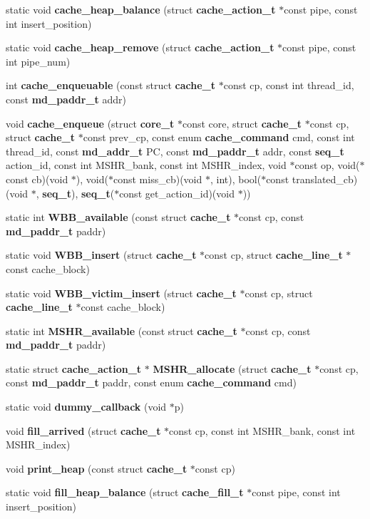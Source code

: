\begin{CompactItemize}
\item 
static void {\bf cache\_\-heap\_\-balance} (struct {\bf cache\_\-action\_\-t} $\ast$const pipe, const int insert\_\-position)
\item 
static void {\bf cache\_\-heap\_\-remove} (struct {\bf cache\_\-action\_\-t} $\ast$const pipe, const int pipe\_\-num)
\item 
int {\bf cache\_\-enqueuable} (const struct {\bf cache\_\-t} $\ast$const cp, const int thread\_\-id, const {\bf md\_\-paddr\_\-t} addr)
\item 
void {\bf cache\_\-enqueue} (struct {\bf core\_\-t} $\ast$const core, struct {\bf cache\_\-t} $\ast$const cp, struct {\bf cache\_\-t} $\ast$const prev\_\-cp, const enum {\bf cache\_\-command} cmd, const int thread\_\-id, const {\bf md\_\-addr\_\-t} PC, const {\bf md\_\-paddr\_\-t} addr, const {\bf seq\_\-t} action\_\-id, const int MSHR\_\-bank, const int MSHR\_\-index, void $\ast$const op, void($\ast$const cb)(void $\ast$), void($\ast$const miss\_\-cb)(void $\ast$, int), bool($\ast$const translated\_\-cb)(void $\ast$, {\bf seq\_\-t}), {\bf seq\_\-t}($\ast$const get\_\-action\_\-id)(void $\ast$))
\item 
static int {\bf WBB\_\-available} (const struct {\bf cache\_\-t} $\ast$const cp, const {\bf md\_\-paddr\_\-t} paddr)
\item 
static void {\bf WBB\_\-insert} (struct {\bf cache\_\-t} $\ast$const cp, struct {\bf cache\_\-line\_\-t} $\ast$const cache\_\-block)
\item 
static void {\bf WBB\_\-victim\_\-insert} (struct {\bf cache\_\-t} $\ast$const cp, struct {\bf cache\_\-line\_\-t} $\ast$const cache\_\-block)
\item 
static int {\bf MSHR\_\-available} (const struct {\bf cache\_\-t} $\ast$const cp, const {\bf md\_\-paddr\_\-t} paddr)
\item 
static struct {\bf cache\_\-action\_\-t} $\ast$ {\bf MSHR\_\-allocate} (struct {\bf cache\_\-t} $\ast$const cp, const {\bf md\_\-paddr\_\-t} paddr, const enum {\bf cache\_\-command} cmd)
\item 
static void {\bf dummy\_\-callback} (void $\ast$p)
\item 
void {\bf fill\_\-arrived} (struct {\bf cache\_\-t} $\ast$const cp, const int MSHR\_\-bank, const int MSHR\_\-index)
\item 
void {\bf print\_\-heap} (const struct {\bf cache\_\-t} $\ast$const cp)
\item 
static void {\bf fill\_\-heap\_\-balance} (struct {\bf cache\_\-fill\_\-t} $\ast$const pipe, const int insert\_\-position)

\end{CompactItemize}
